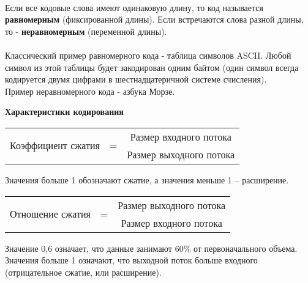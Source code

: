 \\Если все кодовые слова имеют одинаковую длину, то код называется \textbf{равномерным} (фиксированной длины). Если встречаются слова разной длины, то - \textbf{неравномерным} (переменной длины).
\\
\\Классический пример равномерного кода - таблица символов ASCII. Любой символ из этой таблицы будет закодирован одним байтом (один символ всегда кодируется двумя цифрами в шестнадцатеричной системе счисления).
\\Пример неравномерного кода - азбука Морзе.
\\
\begin{center}
  \textbf{Характеристики кодирования}
\end{center}
\begin{table}[h]
\begin{center}
\begin{tabular}{c c c}
\multirow{2}{*}{Коэффициент сжатия} & \multirow{2}{*}{ = }  & Размер входного потока  \\
\hhline{~~-}
 &  & Размер выходного потока
\end{tabular}
\end{center}
Значения больше 1 обозначают сжатие, а значения меньше 1 – расширение.
\end{table}
\begin{table}[h]
\begin{center}
\begin{tabular}{c c c}
\multirow{2}{*}{Отношение сжатия} & \multirow{2}{*}{ = }  & Размер выходного потока  \\
\hhline{~~-}
 &  & Размер входного потока
\end{tabular}
\end{center}
Значение 0,6 означает, что данные занимают 60\% от первоначального объема. Значения больше 1 означают, что выходной поток больше входного (отрицательное сжатие, или расширение).
\end{table}


